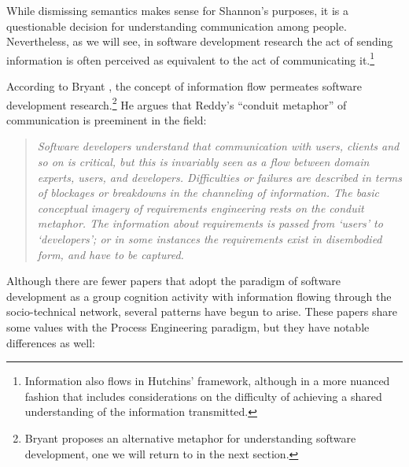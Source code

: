 While dismissing semantics makes sense for Shannon's purposes, it is a questionable decision for understanding communication among people. Nevertheless, as we will see, in software development research the act of sending information is often perceived as equivalent to the act of communicating it.\footnote{Information also flows in Hutchins' framework, although in a more nuanced fashion that includes considerations on the difficulty of achieving a shared understanding of the information transmitted.}

According to Bryant , the concept of information flow permeates software development research.\footnote{Bryant proposes an alternative metaphor for understanding software development, one we will return to in the next section.} He argues that Reddy's ``conduit metaphor'' of communication \cite{Reddy1993} is preeminent in the field:

\begin{quote}
\emph{Software developers understand that communication with users, clients and so on is critical, but this is invariably seen as a flow between domain experts, users, and developers. Difficulties or failures are described in terms of blockages or breakdowns in the channeling of information. The basic conceptual imagery of requirements engineering rests on the conduit metaphor. The information about requirements is passed from `users' to `developers'; or in some instances the requirements exist in disembodied form, and have to be captured.}
\end{quote}

Although there are fewer papers that adopt the paradigm of software development as a group cognition activity with information flowing through the socio-technical network, several patterns have begun to arise. These papers share some values with the Process Engineering paradigm, but they have notable differences as well:

